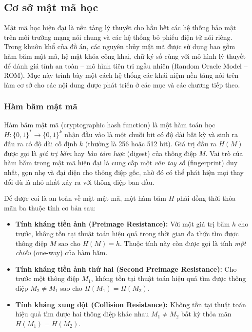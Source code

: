 \subsection{Cơ sở mật mã học}

Mật mã học hiện đại là nền tảng lý thuyết cho hầu hết các hệ thống bảo mật trên môi trường mạng nói chung và các hệ thống bỏ phiếu điện tử nói riêng. Trong khuôn khổ của đồ án, các nguyên thủy mật mã được sử dụng bao gồm hàm băm mật mã, hệ mật khóa công khai, chữ ký số cùng với mô hình lý thuyết để đánh giá tính an toàn -- mô hình tiên tri ngẫu nhiên (Random Oracle Model -- ROM). Mục này trình bày một cách hệ thống các khái niệm nền tảng nói trên làm cơ sở cho các nội dung được phát triển ở các mục và các chương tiếp theo.

\subsubsection{Hàm băm mật mã}

Hàm băm mật mã (cryptographic hash function) là một hàm toán học $H: \{0,1\}^{*} \rightarrow \{0,1\}^{k}$ nhận đầu vào là một chuỗi bit có độ dài bất kỳ và sinh ra đầu ra có độ dài cố định $k$ (thường là 256 hoặc 512 bit). Giá trị đầu ra $H(M)$ được gọi là \textit{giá trị băm} hay \textit{bản tóm lược} (digest) của thông điệp $M$. Vai trò của hàm băm trong mật mã hiện đại là cung cấp một \textit{vân tay số} (fingerprint) duy nhất, gọn nhẹ và đại diện cho thông điệp gốc, nhờ đó có thể phát hiện mọi thay đổi dù là nhỏ nhất xảy ra với thông điệp ban đầu.

Để được coi là an toàn về mặt mật mã, một hàm băm $H$ phải đồng thời thỏa mãn ba thuộc tính cơ bản sau:

\begin{itemize}
    \item \textbf{Tính kháng tiền ảnh (Preimage Resistance):} Với một giá trị băm $h$ cho trước, không tồn tại thuật toán hiệu quả trong thời gian đa thức tìm được thông điệp $M$ sao cho $H(M) = h$. Thuộc tính này còn được gọi là tính \textit{một chiều} (one-way) của hàm băm.

    \item \textbf{Tính kháng tiền ảnh thứ hai (Second Preimage Resistance):} Cho trước một thông điệp $M_1$, không tồn tại thuật toán hiệu quả tìm được thông điệp $M_2 \neq M_1$ sao cho $H(M_1) = H(M_2)$.

    \item \textbf{Tính kháng xung đột (Collision Resistance):} Không tồn tại thuật toán hiệu quả tìm được hai thông điệp khác nhau $M_1 \neq M_2$ bất kỳ thỏa mãn $H(M_1) = H(M_2)$.
\end{itemize}

